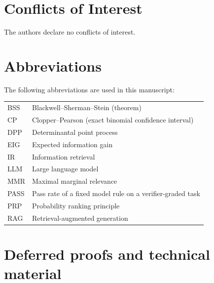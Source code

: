 \documentclass[11pt]{article}
\theoremstyle{plain}
\theoremstyle{definition}
\theoremstyle{remark}
\begin{document}
\section*{Conflicts of Interest}
The authors declare no conflicts of interest.

\section*{Abbreviations}
The following abbreviations are used in this manuscript:

\noindent\begin{tabular}{@{}ll@{}}
BSS  & Blackwell--Sherman--Stein (theorem) \\
CP   & Clopper--Pearson (exact binomial confidence interval) \\
DPP  & Determinantal point process \\
EIG  & Expected information gain \\
IR   & Information retrieval \\
LLM  & Large language model \\
MMR  & Maximal marginal relevance \\
PASS & Pass rate of a fixed model rule on a verifier-graded task \\
PRP  & Probability ranking principle \\
RAG  & Retrieval-augmented generation \\
\end{tabular}

{\small

}

\clearpage
\appendix
\renewcommand{\thetable}{A\arabic{table}}
\renewcommand{\thefigure}{A\arabic{figure}}
\setcounter{table}{0}
\setcounter{figure}{0}

\section{Deferred proofs and technical material}
\label{app:proofs}
\end{document}
